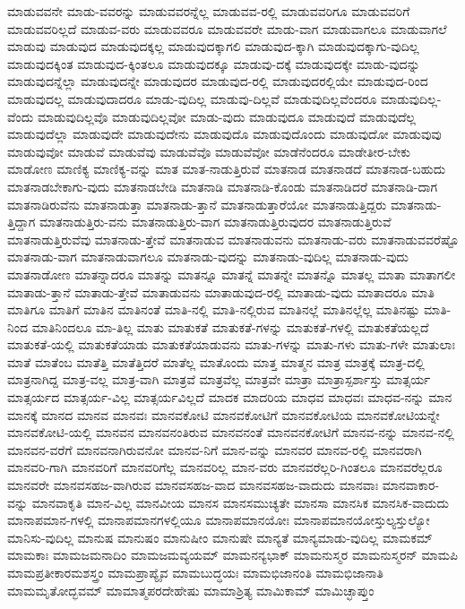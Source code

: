 {ಮಾಡುವವನೇ
ಮಾಡು-ವವರನ್ನು
ಮಾಡುವವರನ್ನೆಲ್ಲ
ಮಾಡುವವ-ರಲ್ಲಿ
ಮಾಡುವವರಿಗೂ
ಮಾಡುವವರಿಗೆ
ಮಾಡುವವರಿಲ್ಲದೆ
ಮಾಡುವ-ವರು
ಮಾಡುವವರೂ
ಮಾಡುವವರೇ
ಮಾಡು-ವಾಗ
ಮಾಡುವಾಗಲೂ
ಮಾಡುವಾಗಲೆ
ಮಾಡುವು
ಮಾಡುವುದ
ಮಾಡುವುದಕ್ಕಲ್ಲ
ಮಾಡುವುದಕ್ಕಾಗಲಿ
ಮಾಡುವುದ-ಕ್ಕಾಗಿ
ಮಾಡುವುದಕ್ಕಾಗು-ವುದಿಲ್ಲ
ಮಾಡುವುದಕ್ಕಿಂತ
ಮಾಡುವುದ-ಕ್ಕಿಂತಲೂ
ಮಾಡುವುದಕ್ಕೂ
ಮಾಡುವು-ದಕ್ಕೆ
ಮಾಡುವುದಕ್ಕೇ
ಮಾಡು-ವುದನ್ನು
ಮಾಡುವುದನ್ನೆಲ್ಲಾ
ಮಾಡುವುದನ್ನೇ
ಮಾಡುವುದರ
ಮಾಡುವುದ-ರಲ್ಲಿ
ಮಾಡುವುದರಲ್ಲಿಯೇ
ಮಾಡುವುದ-ರಿಂದ
ಮಾಡುವುದಲ್ಲ
ಮಾಡುವುದಾದರೂ
ಮಾಡು-ವುದಿಲ್ಲ
ಮಾಡುವು-ದಿಲ್ಲವೆ
ಮಾಡುವುದಿಲ್ಲವೆಂದರೂ
ಮಾಡುವುದಿಲ್ಲ-ವೆಂದು
ಮಾಡುವುದಿಲ್ಲವೊ
ಮಾಡುವುದಿಲ್ಲವೋ
ಮಾಡು-ವುದು
ಮಾಡುವುದೂ
ಮಾಡುವುದೆ
ಮಾಡುವುದೆಲ್ಲ
ಮಾಡುವುದೆಲ್ಲಾ
ಮಾಡುವುದೇ
ಮಾಡುವುದೇನು
ಮಾಡುವುದೊ
ಮಾಡುವುದೊಂದು
ಮಾಡುವುದೋ
ಮಾಡುವುವು
ಮಾಡುವುವೋ
ಮಾಡುವೆ
ಮಾಡುವೆವು
ಮಾಡುವೆವೊ
ಮಾಡುವೆವೋ
ಮಾಡೆನೆಂದರೂ
ಮಾಡೇತೀರ-ಬೇಕು
ಮಾಡೋಣ
ಮಾಣಿಕ್ಯ
ಮಾಣಿಕ್ಯ-ವನ್ನು
ಮಾತ
ಮಾತ-ನಾಡುತ್ತಿರುವೆ
ಮಾತನಾಡ
ಮಾತನಾಡದೆ
ಮಾತನಾಡ-ಬಹುದು
ಮಾತನಾಡಬೇಕಾಗು-ವುದು
ಮಾತನಾಡಬೇಡಿ
ಮಾತನಾಡಿ
ಮಾತನಾಡಿ-ಕೊಂಡು
ಮಾತನಾಡಿದರೆ
ಮಾತನಾಡಿ-ದಾಗ
ಮಾತನಾಡಿರುವೆನು
ಮಾತನಾಡುತ್ತಾ
ಮಾತನಾಡು-ತ್ತಾನೆ
ಮಾತನಾಡುತ್ತಾರೆಯೋ
ಮಾತನಾಡುತ್ತಿದ್ದರು
ಮಾತನಾಡು-ತ್ತಿದ್ದಾಗ
ಮಾತನಾಡುತ್ತಿರು-ವನು
ಮಾತನಾಡುತ್ತಿರು-ವಾಗ
ಮಾತನಾಡುತ್ತಿರುವುದರ
ಮಾತನಾಡುತ್ತಿರುವೆ
ಮಾತನಾಡುತ್ತಿರುವೆವು
ಮಾತನಾಡು-ತ್ತೇವೆ
ಮಾತನಾಡುವ
ಮಾತನಾಡುವನು
ಮಾತನಾಡು-ವರು
ಮಾತನಾಡುವವರೆಷ್ಟೊ
ಮಾತನಾಡು-ವಾಗ
ಮಾತನಾಡುವಾಗಲೂ
ಮಾತನಾಡು-ವುದನ್ನು
ಮಾತನಾಡು-ವುದಿಲ್ಲ
ಮಾತನಾಡು-ವುದು
ಮಾತನಾಡೋಣ
ಮಾತನ್ನಾದರೂ
ಮಾತನ್ನು
ಮಾತನ್ನೂ
ಮಾತನ್ನೆ
ಮಾತನ್ನೇ
ಮಾತನ್ನೊ
ಮಾತಲ್ಲ
ಮಾತಾ
ಮಾತಾಗಲೀ
ಮಾತಾಡು-ತ್ತಾನೆ
ಮಾತಾಡು-ತ್ತೇವೆ
ಮಾತಾಡುವನು
ಮಾತಾಡುವುದ-ರಲ್ಲಿ
ಮಾತಾಡು-ವುದು
ಮಾತಾದರೂ
ಮಾತಿ
ಮಾತಿಗೂ
ಮಾತಿಗೆ
ಮಾತಿನ
ಮಾತಿನಂತೆ
ಮಾತಿ-ನಲ್ಲಿ
ಮಾತಿ-ನಲ್ಲಿರುವ
ಮಾತಿನಲ್ಲೆ
ಮಾತಿನಲ್ಲೆಲ್ಲ
ಮಾತಿನಷ್ಟು
ಮಾತಿ-ನಿಂದ
ಮಾತಿನಿಂದಲೂ
ಮಾ-ತಿಲ್ಲ
ಮಾತು
ಮಾತುಕತೆ
ಮಾತುಕತೆ-ಗಳನ್ನು
ಮಾತುಕತೆ-ಗಳಲ್ಲಿ
ಮಾತುಕತೆಯಲ್ಲದೆ
ಮಾತುಕತೆ-ಯಲ್ಲಿ
ಮಾತುಕತೆಯಾಡು
ಮಾತುಕತೆಯಾಡುವನು
ಮಾತು-ಗಳನ್ನು
ಮಾತು-ಗಳು
ಮಾತು-ಗಳೇ
ಮಾತುಲಾಃ
ಮಾತೆ
ಮಾತೆಂಬ
ಮಾತೆತ್ತಿ
ಮಾತೆತ್ತಿದರೆ
ಮಾತೆಲ್ಲ
ಮಾತೊಂದು
ಮಾತ್ತ
ಮಾತ್ಮನ
ಮಾತ್ರ
ಮಾತ್ರಕ್ಕೆ
ಮಾತ್ರ-ದಲ್ಲಿ
ಮಾತ್ರನಾಗಿದ್ದ
ಮಾತ್ರ-ವಲ್ಲ
ಮಾತ್ರ-ವಾಗಿ
ಮಾತ್ರವೆ
ಮಾತ್ರವೆಲ್ಲ
ಮಾತ್ರವೇ
ಮಾತ್ರಾ
ಮಾತ್ರಾಸ್ಪರ್ಶಾಸ್ತು
ಮಾತ್ಸರ್ಯ
ಮಾತ್ಸರ್ಯದ
ಮಾತ್ಸರ್ಯ-ವಿಲ್ಲ
ಮಾತ್ಸರ್ಯವಿಲ್ಲದೆ
ಮಾದಕ
ಮಾದರಿಯ
ಮಾಧವ
ಮಾಧವಃ
ಮಾಧವ-ನನ್ನು
ಮಾನ
ಮಾನಕ್ಕೆ
ಮಾನದ
ಮಾನವ
ಮಾನವಃ
ಮಾನವಕೋಟಿ
ಮಾನವಕೋಟಿಗೆ
ಮಾನವಕೋಟಿಯ
ಮಾನವಕೋಟಿಯನ್ನೇ
ಮಾನವಕೋಟಿ-ಯಲ್ಲಿ
ಮಾನವನ
ಮಾನವನಂತಿರುವ
ಮಾನವನಂತೆ
ಮಾನವನಕೋಟಿಗೆ
ಮಾನವ-ನನ್ನು
ಮಾನವ-ನಲ್ಲಿ
ಮಾನವನ-ವರೆಗೆ
ಮಾನವನಾಗಿರುವನೋ
ಮಾನವ-ನಿಗೆ
ಮಾನ-ವನ್ನು
ಮಾನವರ
ಮಾನವ-ರಲ್ಲಿ
ಮಾನವರಾಗಿ
ಮಾನವರಿ-ಗಾಗಿ
ಮಾನವರಿಗೆ
ಮಾನವರಿಗೆಲ್ಲ
ಮಾನವರಿಲ್ಲ
ಮಾನ-ವರು
ಮಾನವರೆಲ್ಲರಿ-ಗಿಂತಲೂ
ಮಾನವರೆಲ್ಲರೂ
ಮಾನವರೇ
ಮಾನವಸಹಜ-ವಾಗಿರುವ
ಮಾನವಸಹಜ-ವಾದ
ಮಾನವಸಹಜ-ವಾದುದು
ಮಾನವಾಃ
ಮಾನವಾಕಾರ-ವನ್ನು
ಮಾನವಾಕೃತಿ
ಮಾನ-ವಿಲ್ಲ
ಮಾನವೀಯ
ಮಾನಸ
ಮಾನಸಮುಚ್ಯತೇ
ಮಾನಸಾ
ಮಾನಸಿಕ
ಮಾನಸಿಕ-ವಾದುದು
ಮಾನಾಪಮಾನ-ಗಳಲ್ಲಿ
ಮಾನಾಪಮಾನಗಳಲ್ಲಿಯೂ
ಮಾನಾಪಮಾನಯೋಃ
ಮಾನಾಪಮಾನಯೋಸ್ತುಲ್ಯಸ್ತುಲ್ಯೋ
ಮಾನಿಸು-ವುದಿಲ್ಲ
ಮಾನುಷ
ಮಾನುಷಂ
ಮಾನುಷೀಂ
ಮಾನುಷೇ
ಮಾನ್ಯತೆ
ಮಾನ್ಯಮಾಡು-ವುದಿಲ್ಲ
ಮಾಮಕಮ್
ಮಾಮಕಾಃ
ಮಾಮಜಮನಾದಿಂ
ಮಾಮಜಮವ್ಯಯಮ್
ಮಾಮನನ್ಯಭಾಕ್
ಮಾಮನುಸ್ಮರ
ಮಾಮನುಸ್ಮರನ್
ಮಾಮಪಿ
ಮಾಮಪ್ರತೀಕಾರಮಶಸ್ತ್ರಂ
ಮಾಮಪ್ರಾಪ್ಯೈವ
ಮಾಮಬುದ್ಧಯಃ
ಮಾಮಭಿಜಾನಂತಿ
ಮಾಮಭಿಜಾನಾತಿ
ಮಾಮಮೃತೋದ್ಭವಮ್
ಮಾಮಾತ್ಮಪರದೇಹೇಷು
ಮಾಮಾಶ್ರಿತ್ಯ
ಮಾಮಿಕಾಮ್
ಮಾಮಿಚ್ಛಾಪ್ತುಂ
}
